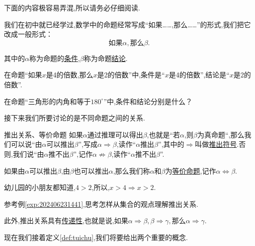 \documentclass[lang=cn,math=cm,chinesefont=nofont,11pt,scheme=chinese,twocol]{elegantbook}
\begin{document}
\begin{remark}
  下面的内容极容易弄混,所以请务必仔细阅读.
\end{remark}

我们在初中就已经学过,数学中的命题经常写成“如果……,那么……”的形式,我们把它改成一般形式：
$$\text{如果}\alpha ,\text{那么}\beta.$$

其中的$\alpha$称为命题的\underline{条件},$\beta$称为命题\underline{结论}.

\begin{example}
  在命题“如果$x$是4的倍数,那么$x$是2的倍数”中,条件是“$x$是4的倍数”,结论是“$x$是2的倍数”.
\end{example}

\begin{exercise}
  在命题“三角形的内角和等于$180^{\circ}$”中,条件和结论分别是什么？
\end{exercise}

\hspace*{\fill}

接下来我们所要讨论的是不同命题之间的关系.

\begin{definition}{推出关系、等价命题}\label{def:tuichu}
  如果$\alpha$通过推理可以得出$\beta$,也就是“若$\alpha$,则$\beta$为真命题“,那么我们可以说“由$\alpha$可以推出$\beta$”,写成$\alpha\Rightarrow\beta$,读作“$\alpha$推出$\beta$”,其中的$\Rightarrow$叫做\underline{推出符号}.否则,我们说“由$\alpha$推不出$\beta$”,记作$\alpha\nRightarrow\beta$,读作“$\alpha$推不出$\beta$”.

  如果由$\alpha$可以推出$\beta$,由$\beta$也可以推出$\alpha$,那么我们称$\alpha$和$\beta$为\underline{等价命题},记作$\alpha\Leftrightarrow\beta$.
\end{definition}

\begin{example}\label{exp:202406231441}
  幼儿园的小朋友都知道,$4>2$,所以,$x>4\Rightarrow x>2$.
\end{example}

\begin{problem}\label{202406262000}
  参考例\ref{exp:202406231441},思考怎样从集合的观点理解推出关系.
\end{problem}

此外,推出关系具有\underline{传递性},也就是说,如果$\alpha\Rightarrow\beta,\beta\Rightarrow\gamma,$那么$\alpha\Rightarrow\gamma$.

\hspace*{\fill}

现在我们接着定义\ref{def:tuichu},我们将要给出两个重要的概念.
\end{document}
